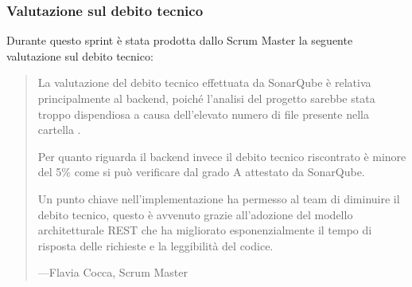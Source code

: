 \documentclass[letterpaper,10pt,italian]{sphinxmanual}
\begin{document}
\subsubsection{Valutazione sul debito tecnico}
\label{\detokenize{development/sprint1/index:valutazione-sul-debito-tecnico}}
\sphinxAtStartPar
Durante questo sprint è stata prodotta dallo Scrum Master la seguente valutazione sul debito tecnico:
\begin{quote}

\sphinxAtStartPar
La valutazione del debito tecnico effettuata da SonarQube è relativa principalmente al backend,
poiché l’analisi del progetto sarebbe stata troppo dispendiosa a causa dell’elevato numero di file presente nella
cartella .

\sphinxAtStartPar
Per quanto riguarda il backend invece il debito tecnico riscontrato è minore del 5\% come si può verificare dal
grado A attestato da SonarQube.

\sphinxAtStartPar
Un punto chiave nell’implementazione ha permesso al team di diminuire il debito tecnico, questo è avvenuto grazie
all’adozione del modello architetturale REST che ha migliorato esponenzialmente il tempo di risposta delle
richieste e la leggibilità del codice.

\begin{flushright}
---Flavia Cocca, Scrum Master
\end{flushright}
\end{quote}
\end{document}
